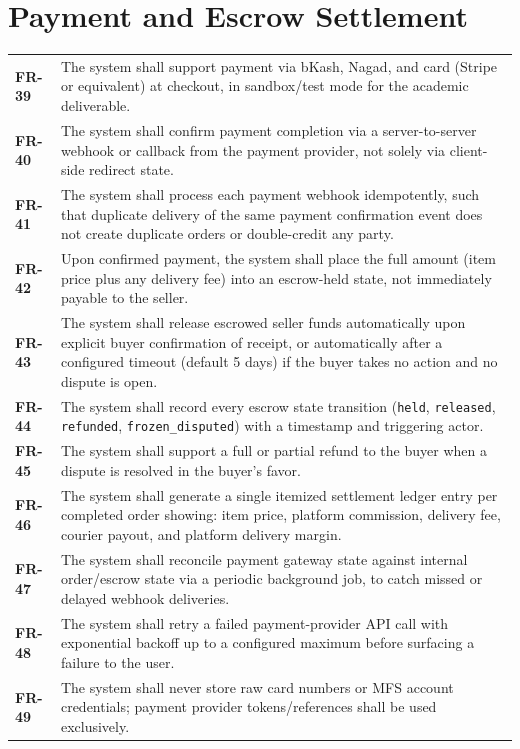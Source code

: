\documentclass[11pt,a4paper]{report}
\newenvironment{reqtable}{\begin{longtable}{p{2.2cm}p{11.5cm}}}{\end{longtable}}
\begin{document}
\section{Payment and Escrow Settlement}
\begin{reqtable}
\textbf{FR-39} & The system shall support payment via bKash, Nagad, and card (Stripe or equivalent) at checkout, in sandbox/test mode for the academic deliverable. \\
\textbf{FR-40} & The system shall confirm payment completion via a server-to-server webhook or callback from the payment provider, not solely via client-side redirect state. \\
\textbf{FR-41} & The system shall process each payment webhook idempotently, such that duplicate delivery of the same payment confirmation event does not create duplicate orders or double-credit any party. \\
\textbf{FR-42} & Upon confirmed payment, the system shall place the full amount (item price plus any delivery fee) into an escrow-held state, not immediately payable to the seller. \\
\textbf{FR-43} & The system shall release escrowed seller funds automatically upon explicit buyer confirmation of receipt, or automatically after a configured timeout (default 5 days) if the buyer takes no action and no dispute is open. \\
\textbf{FR-44} & The system shall record every escrow state transition (\texttt{held}, \texttt{released}, \texttt{refunded}, \texttt{frozen\_disputed}) with a timestamp and triggering actor. \\
\textbf{FR-45} & The system shall support a full or partial refund to the buyer when a dispute is resolved in the buyer's favor. \\
\textbf{FR-46} & The system shall generate a single itemized settlement ledger entry per completed order showing: item price, platform commission, delivery fee, courier payout, and platform delivery margin. \\
\textbf{FR-47} & The system shall reconcile payment gateway state against internal order/escrow state via a periodic background job, to catch missed or delayed webhook deliveries. \\
\textbf{FR-48} & The system shall retry a failed payment-provider API call with exponential backoff up to a configured maximum before surfacing a failure to the user. \\
\textbf{FR-49} & The system shall never store raw card numbers or MFS account credentials; payment provider tokens/references shall be used exclusively. \\
\end{reqtable}
\end{document}

